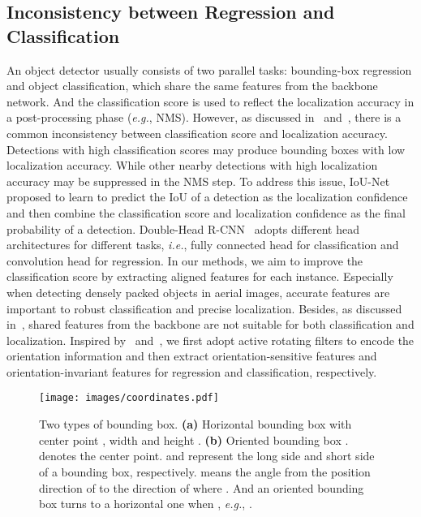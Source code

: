 \documentclass[10pt,journal,final]{IEEEtran}
\def\eg{{\em e.g.}}
\def\ie{{\em i.e.}}
\begin{document}
\vspace*{-3mm}
\subsection{Inconsistency between Regression and Classification}
An object detector usually consists of two parallel tasks: bounding-box regression and object classification, which share the same features from the backbone network. And the classification score is used to reflect the localization accuracy in a post-processing phase (\eg, NMS). However, as discussed in~\cite{Jiang2018iounet} and~\cite{wu2019rethinking}, there is a common inconsistency between classification score and localization accuracy. Detections with high classification scores may produce bounding boxes with low localization accuracy. While other nearby detections with high localization accuracy may be suppressed in the NMS step. To address this issue, IoU-Net~\cite{Jiang2018iounet} proposed to learn to predict the IoU of a detection as the localization confidence and then combine the classification score and localization confidence as the final probability of a detection. Double-Head R-CNN~\cite{wu2019rethinking} adopts different head architectures for different tasks, \ie, fully connected head for classification and convolution head for regression. In our methods, we aim to improve the classification score by extracting aligned features for each instance. Especially when detecting densely packed objects in aerial images, accurate features are important to robust classification and precise localization. Besides, as discussed in~\cite{wu2019rethinking}, shared features from the backbone are not suitable for both classification and localization. Inspired by~\cite{zhou2017orn} and~\cite{liao2018rotation}, we first adopt active rotating filters to encode the orientation information and then extract orientation-sensitive features and orientation-invariant features for regression and classification, respectively.

\begin{figure}[!t]
  \centering
  \texttt{[image: images/coordinates.pdf]}
   \vspace{-2mm}
  \caption{Two types of bounding box. {\bf (a)} Horizontal bounding box  with center point , width  and height . {\bf (b)} Oriented bounding box .  denotes the center point.  and  represent the long side and short side of a bounding box, respectively.  means the angle from the position direction of  to the direction of  where . And an oriented bounding box turns to a horizontal one when , \eg, .}
  \label{fig:coordinates}
   \vspace{-3mm}
\end{figure}
\end{document}
